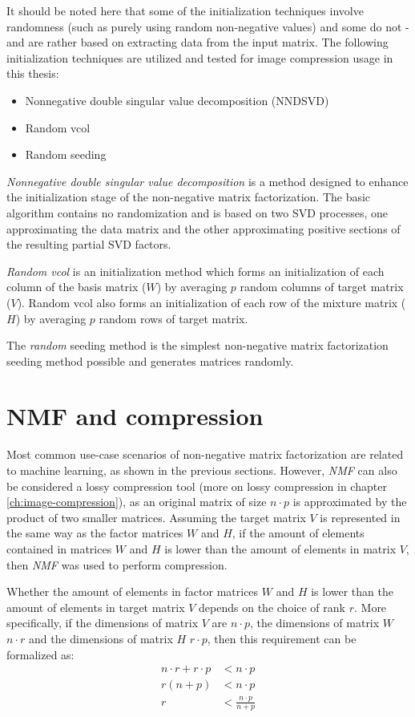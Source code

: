 \documentclass[thesis=M,english]{FITthesis}[2012/10/20]
\begin{document}
It should be noted here that some of the initialization techniques involve randomness
(such as purely using random non-negative values) and some do not - and are rather
based on extracting data from the input matrix. The following initialization techniques
are utilized and tested for image compression usage in this thesis:

\begin{itemize}
  \item Nonnegative double singular value decomposition (NNDSVD)
  \item Random vcol
  \item Random seeding
\end{itemize}

\emph{Nonnegative double singular value decomposition} is a method designed
to enhance the initialization stage of the non-negative matrix factorization.
The basic algorithm contains no randomization and is based on two SVD processes,
one approximating the data matrix and the other approximating positive sections
of the resulting partial SVD factors. \cite{nndsvd}

\emph{Random vcol} is an initialization method which forms an initialization of
each column of the basis matrix ($W$) by averaging $p$ random columns of
target matrix ($V$). Random vcol also forms an initialization of each row
of the mixture matrix ($H$) by averaging $p$ random rows of target matrix.
\cite{randomvcol}

The \emph{random} seeding method is the simplest non-negative matrix
factorization seeding method possible and generates matrices randomly.


\section{NMF and compression}
Most common use-case scenarios of non-negative matrix factorization are
related to machine learning, as shown in the previous sections. However,
\emph{NMF} can also be considered a lossy compression tool (more
on lossy compression in chapter \ref{ch:image-compression}), as an
original matrix of size $n \cdot p$ is approximated by the product
of two smaller matrices. Assuming the target matrix $V$ is represented
in the same way as the factor matrices $W$ and $H$, if the amount
of elements contained in matrices $W$ and $H$ is lower than the amount of
elements in matrix $V$, then \emph{NMF} was used to perform compression.

Whether the amount of elements in factor matrices $W$ and $H$ is lower than
the amount of elements in target matrix $V$ depends on the choice of rank $r$.
More specifically, if the dimensions of matrix $V$ are $n \cdot p$, the
dimensions of matrix $W$ $n \cdot r$ and the dimensions of matrix $H$
$r \cdot p$, then this requirement can be formalized as:
\begin{align*}
  n \cdot r + r \cdot p &< n \cdot p\\
  r (n + p) &< n \cdot p\\
  r &< \frac{n \cdot p}{n + p}
\end{align*}
\end{document}

